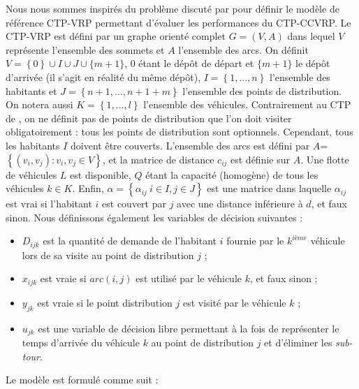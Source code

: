 \documentclass[5p,authoryear,square]{elsarticle}
\begin{document}
Nous nous sommes inspirés du problème discuté par \cite{naji-azimi_covering_2012} pour définir le modèle de référence CTP-VRP permettant d'évaluer les performances du CTP-CCVRP. Le CTP-VRP est défini par un graphe orienté complet $G=(V,A)$ dans lequel $V$ représente l'ensemble des sommets et $A$ l'ensemble des arcs. On définit $V=\left\{0\right\} \cup I \cup J \cup \{m+1\}$,  $0$ étant le dépôt de départ et $\{m+1\}$ le dépôt d'arrivée (il s'agit en réalité du même dépôt), $I= \left\{1,...,n\right\}$ l'ensemble des habitants et $J= \left\{n+1,...,n+1+m\right\}$  l'ensemble des points de distribution. On notera aussi $K= \left\{1,...,l\right\}$ l'ensemble des véhicules. Contrairement au CTP de \cite{gendreau_covering_1997}, on ne définit pas de points de distribution que l'on doit visiter obligatoirement : tous les points de distribution sont optionnels. Cependant, tous les habitants $I$ doivent être couverts. L'ensemble des arcs est défini par $A$= $\left\{(v_i,v_j):v_i,v_j\in V\right\}$, et la matrice de distance $c_{ij}$ est définie sur $A$. Une flotte de véhicules $L$ est disponible, $Q$ étant la capacité (homogène) de tous les véhicules $k \in K$. Enfin, $\alpha = \left\{\alpha_{ij} \ i \in I, j \in J\right\}$ est une matrice dans laquelle $\alpha_{ij}$ est vrai si l'habitant $i$ est couvert par $j$ avec une distance inférieure à $d$, et faux sinon. Nous définissons également les variables de décision suivantes :
\begin{itemize}
 \item $D_{ijk}$ est la quantité de demande de l'habitant $i$ fournie par le $k^{ième}$ véhicule lors de sa visite au point de distribution $j$ ;
 \item $x_{ijk}$ est vraie si $arc(i,j)$ est utilisé par le véhicule $k$, et faux sinon ;
 \item $y_{jk}$ est vraie si le point distribution $j$ est visité par le véhicule $k$ ;
 \item $u_{jk}$ est une variable de décision libre permettant à la fois de représenter le temps d'arrivée du véhicule $k$ au point de distribution $j$ et  d'éliminer les \emph{sub-tour}.
 \end{itemize}

Le modèle est formulé comme suit :
\end{document}
